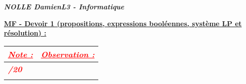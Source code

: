 \documentclass{article}
\begin{document}
\noindent \textbf{\textit{NOLLE \break Damien\break L3 - Informatique}}
\newline
\\
\begin{center}
\textbf{\underline{MF - Devoir 1 (propositions, expressions booléennes, système LP et résolution) :}}
\end{center}
\vspace*{1mm}
\begin{center}
\begin{tabular}{|C{2cm}|L{13cm}|} 
\hline
\textcolor{red}{\textbf{\textit{\underline{Note :}}}} & \textcolor{red}{\textbf{\textit{\underline{Observation :}}}} \\
\hline
\rule{0pt}{1cm} \textcolor{red}{\textbf{\textit{/20}}} &  \\
\rule{0pt}{0.5cm} & \\
\hline
\end{tabular}
\end{center}
\vspace*{3mm}
\end{document}
